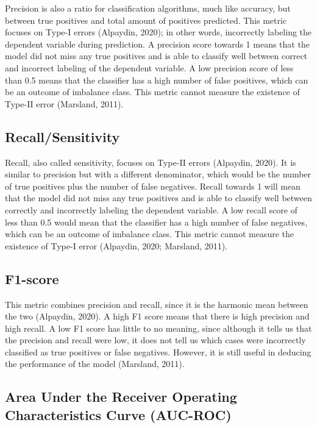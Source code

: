 \documentclass[
  jou]{apa6}
\begin{document}
Precision is also a ratio for classification algorithms, much like accuracy, but between true positives and total amount of positives predicted.
This metric focuses on Type-I errors (Alpaydin, 2020); in other words, incorrectly labeling the dependent variable during prediction.
A precision score towards 1 means that the model did not miss any true positives and is able to classify well between correct and incorrect labeling of the dependent variable.
A low precision score of less than 0.5 means that the classifier has a high number of false positives, which can be an outcome of imbalance class.
This metric cannot measure the existence of Type-II error (Marsland, 2011).

\hypertarget{recallsensitivity}{%
\subsection{Recall/Sensitivity}\label{recallsensitivity}}

Recall, also called sensitivity, focuses on Type-II errors (Alpaydin, 2020).
It is similar to precision but with a different denominator, which would be the number of true positives plus the number of false negatives.
Recall towards 1 will mean that the model did not miss any true positives and is able to classify well between correctly and incorrectly labeling the dependent variable.
A low recall score of less than 0.5 would mean that the classifier has a high number of false negatives, which can be an outcome of imbalance class.
This metric cannot measure the existence of Type-I error (Alpaydin, 2020; Marsland, 2011).

\hypertarget{f1-score}{%
\subsection{F1-score}\label{f1-score}}

This metric combines precision and recall, since it is the harmonic mean between the two (Alpaydin, 2020).
A high F1 score means that there is high precision and high recall.
A low F1 score has little to no meaning, since although it tells us that the precision and recall were low, it does not tell us which cases were incorrectly classified as true positives or false negatives.
However, it is still useful in deducing the performance of the model (Marsland, 2011).

\hypertarget{area-under-the-receiver-operating-characteristics-curve-auc-roc}{%
\subsection{Area Under the Receiver Operating Characteristics Curve (AUC-ROC)}\label{area-under-the-receiver-operating-characteristics-curve-auc-roc}}
\end{document}
